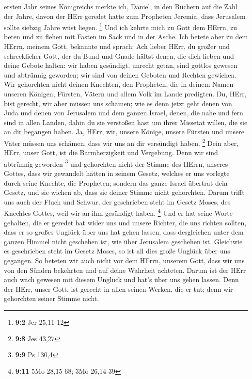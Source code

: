 ersten Jahr seines Königreichs merkte ich, Daniel, in den Büchern auf
die Zahl der Jahre, davon der HErr geredet hatte zum Propheten Jeremia,
dass Jerusalem sollte siebzig Jahre wüst liegen. \footnote{\textbf{9:2}
  Jer 25,11-12}  Und ich kehrte mich zu Gott dem HErrn, zu
beten und zu flehen mit Fasten im Sack und in der Asche. 
Ich betete aber zu dem HErrn, meinem Gott, bekannte und sprach: Ach
lieber HErr, du großer und schrecklicher Gott, der du Bund und Gnade
hältst denen, die dich lieben und deine Gebote halten:  wir
haben gesündigt, unrecht getan, sind gottlos gewesen und abtrünnig
geworden; wir sind von deinen Geboten und Rechten gewichen. 
Wir gehorchten nicht deinen Knechten, den Propheten, die in deinem Namen
unseren Königen, Fürsten, Vätern und allem Volk im Lande predigten.
 Du, HErr, bist gerecht, wir aber müssen uns schämen; wie es
denn jetzt geht denen von Juda und denen von Jerusalem und dem ganzen
Israel, denen, die nahe und fern sind in allen Landen, dahin du sie
verstoßen hast um ihrer Missetat willen, die sie an dir begangen haben.
 Ja, HErr, wir, unsere Könige, unsere Fürsten und unsere
Väter müssen uns schämen, dass wir uns an dir versündigt haben.
\footnote{\textbf{9:8} Jes 43,27}  Dein aber, HErr, unser
Gott, ist die Barmherzigkeit und Vergebung. Denn wir sind abtrünnig
geworden \footnote{\textbf{9:9} Ps 130,4}  und gehorchten
nicht der Stimme des HErrn, unseres Gottes, dass wir gewandelt hätten in
seinem Gesetz, welches er uns vorlegte durch seine Knechte, die
Propheten;  sondern das ganze Israel übertrat dein Gesetz,
und sie wichen ab, dass sie deiner Stimme nicht gehorchten. Darum trifft
uns auch der Fluch und Schwur, der geschrieben steht im Gesetz Moses,
des Knechtes Gottes, weil wir an ihm gesündigt haben. \footnote{\textbf{9:11}
  5Mo 28,15-68; 3Mo 26,14-39}  Und er hat seine Worte
gehalten, die er geredet hat wider uns und unsere Richter, die uns
richten sollten, dass er so großes Unglück über uns hat gehen lassen,
dass desgleichen unter dem ganzen Himmel nicht geschehen ist, wie über
Jerusalem geschehen ist.  Gleichwie es geschrieben steht im
Gesetz Moses, so ist all dies große Unglück über uns gegangen. So
beteten wir auch nicht vor dem HErrn, unserem Gott, dass wir uns von den
Sünden bekehrten und auf deine Wahrheit achteten.  Darum
ist der HErr auch wach gewesen mit diesem Unglück und hat's über uns
gehen lassen. Denn der HErr, unser Gott, ist gerecht in allen seinen
Werken, die er tut; denn wir gehorchten seiner Stimme nicht.
